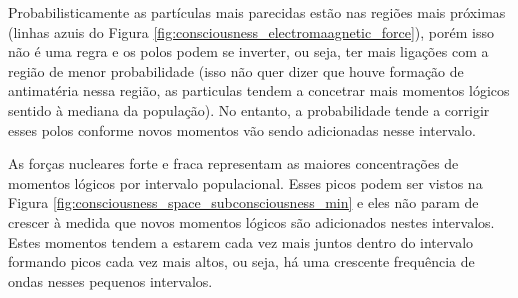 Probabilisticamente as partículas mais parecidas estão nas regiões mais próximas (linhas azuis do Figura \ref{fig:consciousness_electromaagnetic_force}), porém isso não é uma regra e os polos podem se inverter, ou seja, ter mais ligações com a região de menor probabilidade (isso não quer dizer que houve formação de antimatéria nessa região, as particulas tendem a concetrar mais momentos lógicos sentido à mediana da população). No entanto, a probabilidade tende a corrigir esses polos conforme novos momentos vão sendo adicionadas nesse intervalo. 

As forças nucleares forte e fraca representam as maiores concentrações de momentos lógicos por intervalo populacional. Esses picos podem ser vistos na Figura \ref{fig:consciousness_space_subconsciousness_min} e eles não param de crescer à medida que novos momentos lógicos são adicionados nestes intervalos. Estes momentos tendem a estarem cada vez mais juntos dentro do intervalo formando picos cada vez mais altos, ou seja, há uma crescente frequência de ondas nesses pequenos intervalos.

